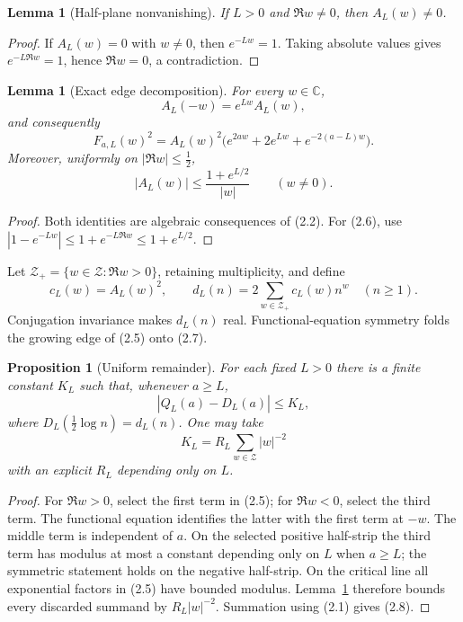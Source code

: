 \documentclass[11pt]{article}
\newtheorem{proposition}[theorem]{Proposition}
\newtheorem{lemma}[theorem]{Lemma}
\newcommand{\C}{\mathbb C}
\newcommand{\cZ}{\mathcal Z}
\begin{document}
\begin{lemma}[Half-plane nonvanishing]\label{lem:nonvanishing}
If $L>0$ and $\Re w\ne0$, then $A_L(w)\ne0$.
\end{lemma}

\begin{proof}
If $A_L(w)=0$ with $w\ne0$, then $e^{-Lw}=1$.  Taking absolute values gives
$e^{-L\Re w}=1$, hence $\Re w=0$, a contradiction.
\end{proof}

\begin{lemma}[Exact edge decomposition]\label{lem:edge}
For every $w\in\C$,
\[
  A_L(-w)=e^{Lw}A_L(w),
  \tag{2.4}
\]
and consequently
\[
  F_{a,L}(w)^2=A_L(w)^2
  \bigl(e^{2aw}+2e^{Lw}+e^{-2(a-L)w}\bigr).
  \tag{2.5}
\]
Moreover, uniformly on $|\Re w|\le\frac12$,
\[
  |A_L(w)|\le \frac{1+e^{L/2}}{|w|}\qquad(w\ne0).
  \tag{2.6}
\]
\end{lemma}

\begin{proof}
Both identities are algebraic consequences of (2.2).  For (2.6), use
$|1-e^{-Lw}|\le1+e^{-L\Re w}\le1+e^{L/2}$.
\end{proof}

Let $\cZ_+=\{w\in\cZ:\Re w>0\}$, retaining multiplicity, and define
\[
  c_L(w)=A_L(w)^2,
  \qquad
  d_L(n)=2\sum_{w\in\cZ_+}c_L(w)n^w
  \quad(n\ge1).
  \tag{2.7}
\]
Conjugation invariance makes $d_L(n)$ real.  Functional-equation symmetry folds the growing edge
of (2.5) onto (2.7).

\begin{proposition}[Uniform remainder]\label{prop:remainder}
For each fixed $L>0$ there is a finite constant $K_L$ such that, whenever
$a\ge L$,
\[
  \left|Q_L(a)-D_L(a)\right|\le K_L,
  \tag{2.8}
\]
where $D_L(\frac12\log n)=d_L(n)$.  One may take
\[
  K_L=R_L\sum_{w\in\cZ}|w|^{-2}
  \tag{2.9}
\]
with an explicit $R_L$ depending only on $L$.
\end{proposition}

\begin{proof}
For $\Re w>0$, select the first term in (2.5); for $\Re w<0$, select the third
term.  The functional equation identifies the latter with the first term at $-w$.  The middle
term is independent of $a$.  On the selected positive half-strip the third term has modulus at
most a constant depending only on $L$ when $a\ge L$; the symmetric statement holds on the
negative half-strip.  On the critical line all exponential factors in (2.5) have bounded modulus.
Lemma~\ref{lem:edge} therefore bounds every discarded summand by $R_L|w|^{-2}$.
Summation using (2.1) gives (2.8).
\end{proof}
\end{document}
